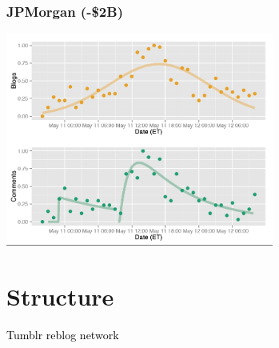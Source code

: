 \documentclass{beamer}
\begin{document}
\begin{frame}\frametitle{JPMorgan (-\$2B)}
 \hfill \includegraphics[height=7.0cm]{./imgs/SMP_JPMorgan_bottom.png}
\end{frame}

\section{Structure}
{
\begin{frame}
\textcolor{black} {
\hfill \Huge \insertsection}
\end{frame}
}

{
\begin{frame}
\textcolor{black} {
\vfill \hfill \Large Tumblr reblog network}
\end{frame}
}
\end{document}
